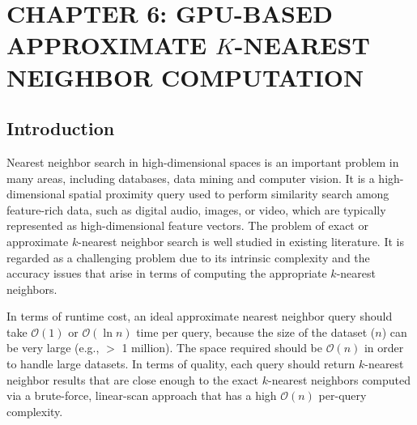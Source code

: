\chapter[GPU-BASED APPROXIMATE $K$-NEAREST NEIGHBOR COMPUTATION]{CHAPTER 6: GPU-BASED APPROXIMATE $K$-NEAREST \\ NEIGHBOR  COMPUTATION} 
\label{chp:GLSH}

\section{Introduction}
Nearest neighbor search in high-dimensional spaces is an important problem in many areas, including databases, data mining and computer vision. It is a high-dimensional spatial proximity query used to perform similarity search among feature-rich data, such as digital audio, images, or video, which are typically represented as high-dimensional feature vectors. The problem of exact or approximate $k$-nearest neighbor search is well studied in existing literature. It is regarded as a challenging problem due to its intrinsic complexity and the accuracy issues that arise in terms of computing the appropriate $k$-nearest neighbors.

In terms of runtime cost, an ideal approximate nearest neighbor query should take $\mathcal O(1)$ or $\mathcal O(\ln n)$ time per query, because the size of the dataset ($n$) can be very large (e.g., $>$ 1 million). The space required should be $\mathcal O(n)$ in order to handle large datasets. In terms of quality, each query should return $k$-nearest neighbor results that are close enough to the exact $k$-nearest neighbors computed via a brute-force, linear-scan approach that has a high $\mathcal O(n)$ per-query complexity.


